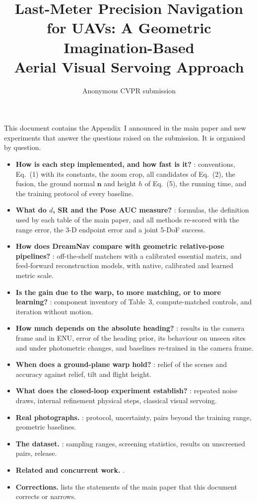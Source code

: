 \documentclass[10pt,twocolumn,letterpaper]{article}
\title{Last-Meter Precision Navigation for UAVs: A Geometric Imagination-Based\\ Aerial Visual Servoing Approach}
\author{Anonymous CVPR submission}
\begin{document}
\maketitlesupplementary

\noindent This document contains the Appendix~I announced in the main paper and new experiments that answer the questions raised on the submission. It is organised by question.

\begin{itemize}[leftmargin=*,itemsep=1pt,topsep=3pt]
\item \textbf{How is each step implemented, and how fast is it?} : conventions, Eq.~(1) with its constants, the zoom crop, all candidates of Eq.~(2), the fusion, the ground normal $\mathbf{n}$ and height $h$ of Eq.~(5), the running time, and the training protocol of every baseline.
\item \textbf{What do $d$, SR and the Pose AUC measure?} : formulas, the definition used by each table of the main paper, and all methods re-scored with the range error, the 3-D endpoint error and a joint 5-DoF success.
\item \textbf{How does DreamNav compare with geometric relative-pose pipelines?} : off-the-shelf matchers with a calibrated essential matrix, and feed-forward reconstruction models, with native, calibrated and learned metric scale.
\item \textbf{Is the gain due to the warp, to more matching, or to more learning?} : component inventory of Table~3, compute-matched controls, and iteration without motion.
\item \textbf{How much depends on the absolute heading?} : results in the camera frame and in ENU, error of the heading prior, its behaviour on unseen sites and under photometric changes, and baselines re-trained in the camera frame.
\item \textbf{When does a ground-plane warp hold?} : relief of the scenes and accuracy against relief, tilt and flight height.
\item \textbf{What does the closed-loop experiment establish?} : repeated noise draws, internal refinement \vs physical steps, classical visual servoing.
\item \textbf{Real photographs.} : protocol, uncertainty, pairs beyond the training range, geometric baselines.
\item \textbf{The dataset.} : sampling ranges, screening statistics, results on unscreened pairs, release.
\item \textbf{Related and concurrent work.} .
\item \textbf{Corrections.}  lists the statements of the main paper that this document corrects or narrows.
\end{itemize}
\end{document}
